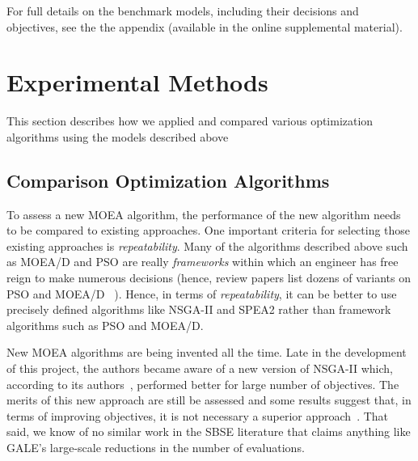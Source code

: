 \documentclass[10pt,journal,compsoc]{IEEEtran}
\newcommand{\bi}{\begin{itemize}}
\newcommand{\ei}{\end{itemize}}
\begin{document}
For full  details on the benchmark models, including their decisions
and objectives, see the the appendix
(available in the online supplemental material). 




\section{Experimental Methods}

This section describes how we applied and compared various optimization algorithms using the models described above

\subsection{Comparison Optimization Algorithms}\label{sec:compares}
 
To  assess a new MOEA algorithm, the performance of the new algorithm needs
to be compared to existing approaches.
One important criteria for selecting those existing approaches is
 {\em repeatability}. 
Many of the algorithms described above such as MOEA/D and PSO
are really {\em frameworks} within which an engineer has free reign to make numerous decisions
(hence, 
review papers list dozens of variants on  PSO and MOEA/D ~\cite{5601760,Poli07particleswarm}).
Hence, in terms of {\em repeatability}, it can be better to use precisely defined algorithms like NSGA-II and SPEA2 rather than framework algorithms such as PSO and MOEA/D.

New MOEA  algorithms are being invented all the time.
Late in the development of this project, the authors became
aware of a new version of NSGA-II which, according to its
authors~\cite{6600851}, performed better for large number of objectives.
The merits of this new approach are still be assessed and some
results suggest that, in terms of improving objectives, it is not necessary a superior approach~\cite{sato14}. That said, we know of no similar work
in the SBSE literature that claims anything like GALE's large-scale
reductions in the number
of evaluations.
\end{document}
